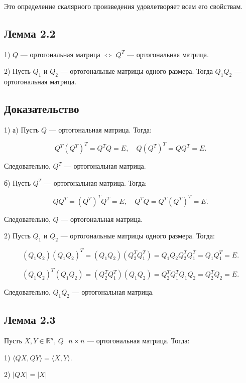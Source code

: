 {Это определение скалярного произведения удовлетворяет всем его свойствам.

\subsection*{Лемма 2.2}

1) \( Q \) — ортогональная матрица \( \iff \) \( Q^T \) — ортогональная матрица.

2) Пусть \( Q_1 \) и \( Q_2 \) — ортогональные матрицы одного размера. Тогда \( Q_1 Q_2 \) — ортогональная матрица.

\subsection*{Доказательство}

1) а) Пусть \( Q \) — ортогональная матрица. Тогда:

\[
Q^T (Q^T)^T = Q^T Q = E, \quad Q (Q^T)^T = Q Q^T = E.
\]

Следовательно, \( Q^T \) — ортогональная матрица.

б) Пусть \( Q^T \) — ортогональная матрица. Тогда:

\[
Q Q^T = (Q^T)^T Q^T = E, \quad Q^T Q = Q^T (Q^T)^T = E.
\]

Следовательно, \( Q \) — ортогональная матрица.

2) Пусть \( Q_1 \) и \( Q_2 \) — ортогональные матрицы одного размера. Тогда:

\[
(Q_1 Q_2) (Q_1 Q_2)^T = (Q_1 Q_2) (Q_2^T Q_1^T) = Q_1 Q_2 Q_2^T Q_1^T = Q_1 Q_1^T = E.
\]

\[
(Q_1 Q_2)^T (Q_1 Q_2) = (Q_2^T Q_1^T) (Q_1 Q_2) = Q_2^T Q_1^T Q_1 Q_2 = Q_2^T Q_2 = E.
\]



Следовательно, \( Q_1 Q_2 \) — ортогональная матрица.

\subsection*{Лемма 2.3}

Пусть \( X, Y \in \mathbb{R}^n \), \( Q \,\,\,\,  {n \times n} \) — ортогональная матрица. Тогда:

1) \( \langle Q X, Q Y \rangle = \langle X, Y \rangle \).

2) \( |Q X| = |X| \)
}